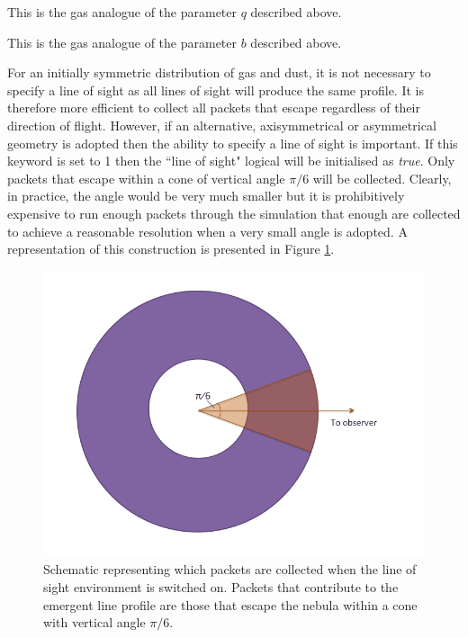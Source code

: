 
 This is the gas analogue of the parameter $q$ described above.  


 This is the gas analogue of the parameter $b$ described above.  

\vspace{0.8cm}


 For an initially symmetric distribution of gas and dust, it is not necessary to specify a line of sight as all lines of sight will produce the same profile.  It is therefore more efficient to collect all packets that escape regardless of their direction of flight.  However, if an alternative, axisymmetrical or asymmetrical geometry is adopted then the ability to specify a line of sight is important.  If this keyword is set to 1 then the ``line of sight" logical will be initialised as \textit{true}.  Only packets that escape within a cone of vertical angle $\pi/6$ will be collected.  Clearly, in practice, the angle would be very much smaller but it is prohibitively expensive to run enough packets through the simulation that enough are collected to achieve a reasonable resolution when a very small  angle is adopted.  A representation of this construction is presented in Figure \ref{fig:LOS}.

 
 \begin{figure}
 \centering
 \includegraphics[scale=0.55, trim=-25mm 10mm 29mm 0mm]{chapters/chapter2/LoS_diagram.png}
 \caption{Schematic representing which packets are collected when the line of sight environment is switched on.  Packets that contribute to the emergent line profile are those that escape the nebula within a cone with vertical angle $\pi/6$.}
 \label{fig:LOS}
 \end{figure}
 
